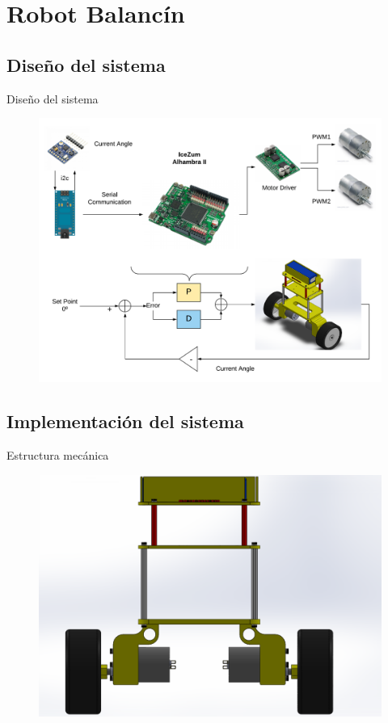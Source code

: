 \documentclass{beamer}
\begin{document}
\section{Robot Balancín}
\subsection{Diseño del sistema}
\begin{frame}{Diseño del sistema}
\begin{figure}[H]
	\center
	\includegraphics[trim = 0mm 0mm 0mm 0mm, clip,scale=0.3]{imagenes/Balancing_robot/final.pdf}
	\caption{}
	\label{}
\end{figure}
\end{frame}	
\subsection{Implementación del sistema}

\begin{frame}{Estructura mecánica}
\begin{center}
	\begin{figure}[H]
		\center
		\includegraphics[trim = 1cm 0mm 2.7cm 0mm,clip, angle=0, scale = 0.35]{imagenes/Balancing_Robot/EnsanBalanceFront.PDF}
	\end{figure}
\end{center}
\end{frame}
\end{document}
